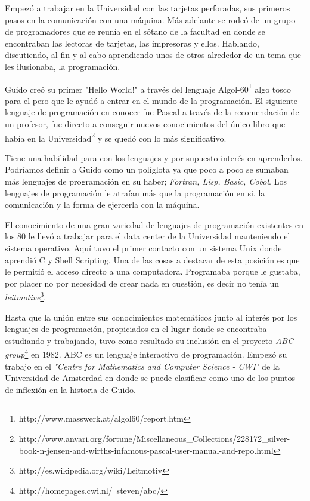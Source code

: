 \documentclass[11pt]{scrartcl}
\begin{document}
Empezó a trabajar en la Universidad con las tarjetas perforadas, sus primeros pasos en la comunicación con una máquina. Más adelante se rodeó de un grupo de programadores que se reunía en el sótano de la facultad en donde se encontraban las lectoras de tarjetas, las impresoras y ellos. Hablando, discutiendo, al fin y al cabo aprendiendo unos de otros alrededor de un tema que les ilusionaba, la programación.

Guido creó su primer "Hello World!" a través del lenguaje Algol-60\footnote{http://www.masswerk.at/algol60/report.htm} algo tosco para el pero que le ayudó a entrar en el mundo de la programación. El siguiente lenguaje de programación en conocer fue Pascal a través de la recomendación de un profesor, fue directo a conseguir nuevos conocimientos del único libro que había en la Universidad\footnote{http://www.anvari.org/fortune/Miscellaneous\_Collections/228172\_silver-book-n-jensen-and-wirths-infamous-pascal-user-manual-and-repo.html} y se quedó con lo más significativo.

Tiene una habilidad para con los lenguajes y por supuesto interés en aprenderlos. Podríamos definir a Guido como un políglota ya que poco a poco se sumaban más lenguajes de programación en su haber; \emph{Fortran, Lisp, Basic, Cobol}. Los lenguajes de programación le atraían más que la programación en si, la comunicación y la forma de ejercerla con la máquina.

El conocimiento de una gran variedad de lenguajes de programación existentes en los 80 le llevó a trabajar para el data center de la Universidad manteniendo el sistema operativo. Aquí tuvo el primer contacto con un sistema Unix donde aprendió C y Shell Scripting. Una de las cosas a destacar de esta posición es que le permitió el acceso directo a una computadora. Programaba porque le gustaba, por placer no por necesidad de crear nada en cuestión, es decir no tenía un \emph{leitmotive}\footnote{http://es.wikipedia.org/wiki/Leitmotiv}.

Hasta que la unión entre sus conocimientos matemáticos junto al interés por los lenguajes de programación, propiciados en el lugar donde se encontraba estudiando y trabajando, tuvo como resultado su inclusión en el proyecto \emph{ABC group}\footnote{http://homepages.cwi.nl/~steven/abc/} en 1982. ABC es un lenguaje interactivo de programación. Empezó su trabajo en el \emph{"Centre for Mathematics and Computer Science - CWI"} de la Universidad de Amsterdad en donde se puede clasificar como uno de los puntos de inflexión en la historia de Guido.
\end{document}
